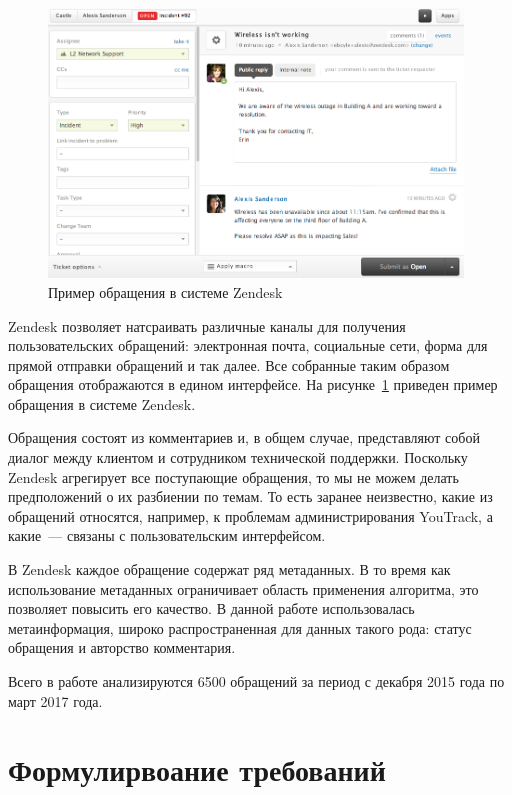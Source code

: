\begin{figure}[tph!]
\centerline{\includegraphics[width=11cm]{fig/zendesk2.png}}
    \caption{Пример обращения в системе Zendesk}
    \label{fig:zdesk_ticket}
\end{figure}

Zendesk позволяет натсраивать различные каналы для получения пользовательских обращений: электронная почта, социальные сети, форма для прямой отправки обращений и так далее. Все собранные таким образом обращения отображаются в едином интерфейсе. На рисунке~\ref{fig:zdesk_ticket} приведен пример обращения в системе Zendesk. 

Обращения состоят из комментариев и, в общем случае, представляют собой диалог между клиентом и сотрудником технической поддержки. Поскольку Zendesk агрегирует все поступающие  обращения, то мы не можем делать предположений о их разбиении по темам. То есть заранее неизвестно, какие из обращений относятся, например, к проблемам администрирования YouTrack, а какие~--- связаны с пользовательским интерфейсом.

В Zendesk каждое обращение содержат ряд метаданных. В то время как использование метаданных ограничивает область применения алгоритма, это позволяет повысить его качество. В данной работе использовалась метаинформация, широко распространенная для данных такого рода: статус обращения и авторство комментария.

Всего в работе анализируются 6500 обращений за период с декабря 2015 года по март 2017 года. 

\section{Формулирвоание требований}
\label{sec:features}

